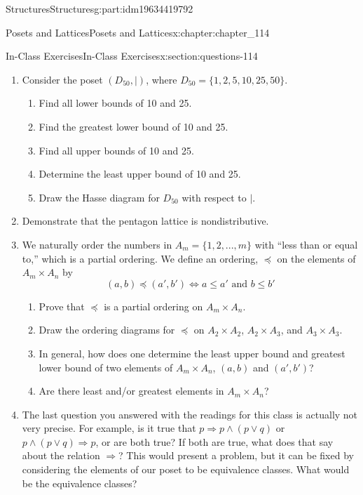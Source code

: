 \documentclass[oneside,10pt,]{book}
\numberwithin{equation}{section}
\begin{document}
\begin{partptx}{Structures}{}{Structures}{}{}{g:part:idm19634419792}
\begin{chapterptx}{Posets and Lattices}{}{Posets and Lattices}{}{}{x:chapter:chapter_114}
\typeout{************************************************}
%
\begin{sectionptx}{In-Class Exercises}{}{In-Class Exercises}{}{}{x:section:questions-114}
%
\begin{enumerate}[label=\arabic*.]
\item{}Consider the poset \((D_{50},\mid)\), where \(D_{50} = \{1,2,5,10,25,50\}\).%
\begin{enumerate}[label=(\alph*)]
\item{}Find all lower bounds of 10 and 25.%
\item{}Find the greatest lower bound  of 10 and 25.%
\item{}Find all upper bounds of 10 and 25.%
\item{}Determine the least upper bound  of 10 and 25.%
\item{}Draw the Hasse diagram for \(D_{50}\) with respect to \(\mid\).%
\end{enumerate}
%
\item{}Demonstrate that the pentagon lattice is nondistributive.%
\item{}We naturally order the numbers in \(A_m = \{1, 2, . . . , m\}\) with ``less than or equal to,'' which is a partial ordering. We define an ordering, \(\preceq\)  on the elements of \(A_m \times  A_n\) by%
\begin{equation*}
(a, b) \preceq  (a', b') \Leftrightarrow a \leq  a' \textrm{ and } b \leq  b'
\end{equation*}
%
\begin{enumerate}[label=(\alph*)]
\item{}Prove that \(\preceq\) is a partial ordering on \(A_m \times  A_n\).%
\item{}Draw the ordering diagrams for \(\preceq\) on \(A_2 \times  A_2\), \(A_2\times  A_3\), and \(A_3 \times  A_3\).%
\item{}In general, how does one determine the least upper bound  and greatest lower bound of two elements of \(A_m \times  A_n\), \((a, b)\) and \((a',b')\)?%
\item{}Are there least and\slash{}or greatest elements in \(A_m \times  A_n\)?%
\end{enumerate}
%
\item{}The last question you answered with the readings for this class is actually not very precise.  For example,  is it true that  \(p \Rightarrow p\land(p \lor q)\) or  \(p\land(p \lor q) \Rightarrow p\), or are both true?  If both are true, what does that say about the relation \(\Rightarrow\)?   This would present a problem, but it can be fixed by considering the elements of our poset to be equivalence classes.  What would be the equivalence classes?%

\end{enumerate}
\end{sectionptx}
\end{chapterptx}
\end{partptx}
\end{document}

